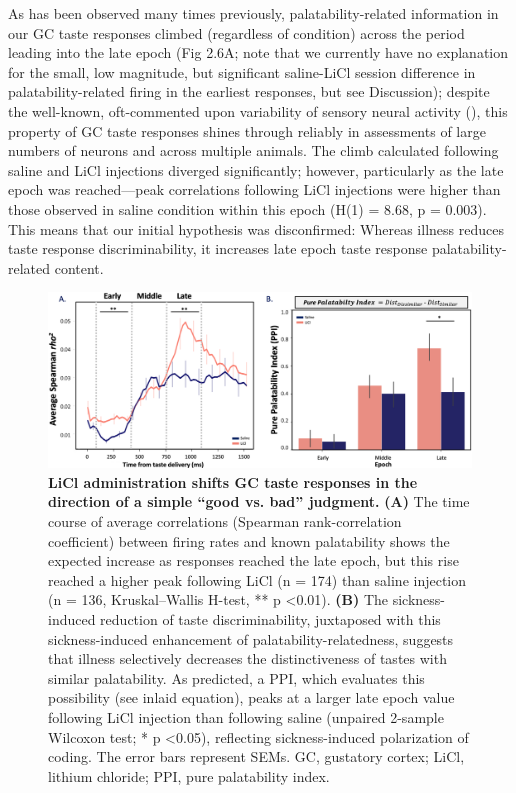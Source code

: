 \begin{refsection}
As has been observed many times previously, palatability-related information in our GC taste responses climbed (regardless of condition) across the period leading into the late epoch (Fig 2.6A; note that we currently have no explanation for the small, low magnitude, but significant saline-LiCl session difference in palatability-related firing in the earliest responses, but see Discussion); despite the well-known, oft-commented upon variability of sensory neural activity (\cite{shadlen1998a,shadlen1994a}), this property of GC taste responses shines through reliably in assessments of large numbers of neurons and across multiple animals. The climb calculated following saline and LiCl injections diverged significantly; however, particularly as the late epoch was reached—peak correlations following LiCl injections were higher than those observed in saline condition within this epoch (H(1) = 8.68, p = 0.003). This means that our initial hypothesis was disconfirmed: Whereas illness reduces taste response discriminability, it increases late epoch taste response palatability-related content.

\begin{figure}
\includegraphics[width=\linewidth]{stone_2022_figs/journal.pbio.3001537.g006.png} 
\caption{\textbf{LiCl administration shifts GC taste responses in the direction of a simple “good vs. bad” judgment.}
\textbf{(A)} The time course of average correlations (Spearman rank-correlation coefficient) between firing rates and known palatability shows the expected increase as responses reached the late epoch, but this rise reached a higher peak following LiCl (n = 174) than saline injection (n = 136, Kruskal–Wallis H-test, ** p \textless 0.01). \textbf{(B)} The sickness-induced reduction of taste discriminability, juxtaposed with this sickness-induced enhancement of palatability-relatedness, suggests that illness selectively decreases the distinctiveness of tastes with similar palatability. As predicted, a PPI, which evaluates this possibility (see inlaid equation), peaks at a larger late epoch value following LiCl injection than following saline (unpaired 2-sample Wilcoxon test; * p \textless 0.05), reflecting sickness-induced polarization of coding. The error bars represent SEMs. GC, gustatory cortex; LiCl, lithium chloride; PPI, pure palatability index.
}
\label{fig:wrapfig}
\end{figure}



\end{refsection}
